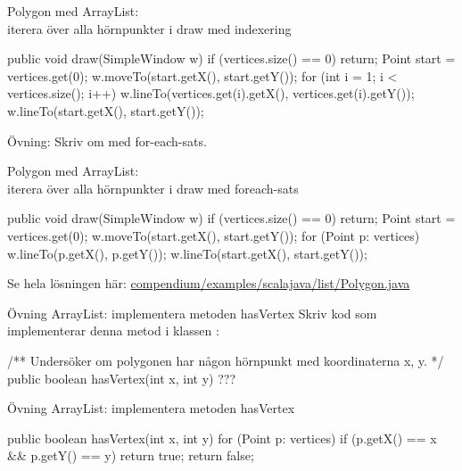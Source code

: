 \begin{Slide}{Polygon med ArrayList: \\iterera över alla hörnpunkter i draw med indexering}
\begin{Code}[numberstyle=,language=Java]
    public void draw(SimpleWindow w) {
        if (vertices.size() == 0) {
            return;
        }
        Point start = vertices.get(0);
        w.moveTo(start.getX(), start.getY());
        for (int i = 1; i < vertices.size(); i++) {
            w.lineTo(vertices.get(i).getX(), 
                     vertices.get(i).getY());
        }
        w.lineTo(start.getX(), start.getY());
    }
\end{Code}

Övning: Skriv om med for-each-sats.
\end{Slide}

\begin{Slide}{Polygon med ArrayList: \\iterera över alla hörnpunkter i draw med foreach-sats}
\begin{Code}[numberstyle=,language=Java]
    public void draw(SimpleWindow w) {
        if (vertices.size() == 0) {
            return;
        }
        Point start = vertices.get(0);
        w.moveTo(start.getX(), start.getY());
        for (Point p: vertices){
            w.lineTo(p.getX(), p.getY());
        }
        w.lineTo(start.getX(), start.getY());
    }
\end{Code}

Se hela lösningen här:
\href{https://github.com/lunduniversity/introprog/tree/master/compendium/examples/scalajava/list/Polygon.java}{compendium/examples/scalajava/list/Polygon.java}
\end{Slide}

\begin{Slide}{Övning ArrayList: implementera metoden hasVertex}
Skriv kod som implementerar denna metod i klassen :
\begin{Code}[numberstyle=,language=Java]
/** Undersöker om polygonen har någon hörnpunkt med koordinaterna x, y. */ 
public boolean hasVertex(int x, int y) {
    ???
} 
\end{Code}
\end{Slide}

\begin{Slide}{Övning ArrayList: implementera metoden hasVertex}
\begin{Code}[numberstyle=,language=Java]
    public boolean hasVertex(int x, int y){
        for (Point p: vertices){
            if (p.getX() == x && p.getY() == y){
                return true;
            }
        }
        return false;
    }
\end{Code}
\end{Slide}


